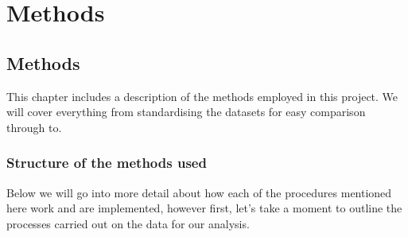 \documentclass[../main.tex]{subfiles}
\begin{document}
\part{Methods}
\label{Chap:Methods}

\chapter{Methods}
This chapter includes a description of the methods employed in this project. We will cover everything from standardising the datasets for easy comparison through to.

\section{Structure of the methods used}
Below we will go into more detail about how each of the procedures mentioned here work and are implemented, however first, let's take a moment to outline the processes carried out on the data for our analysis.
\end{document}
